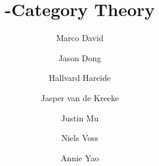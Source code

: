 \title{\Ainf{}-Category Theory}
\author{Marco David \and Jason Dong \and Hallvard Hareide \and Jasper van de Kreeke \and Justin Mu \and Niels Voss \and Annie Yao}
